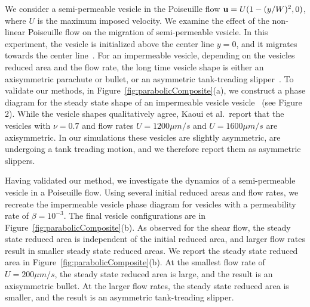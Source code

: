 \documentclass[9pt,twocolumn,twoside,lineno]{pnas-new}
\begin{document}
We consider a semi-permeable vesicle in the Poiseuille flow $\mathbf{u} =
U(1-(y/W)^2,0)$, where $U$ is the maximum imposed velocity. We examine
the effect of the non-linear Poiseuille flow on the migration of
semi-permeable vesicle. In this experiment, the vesicle is initialized
above the center line $y=0$, and it migrates towards the center
line~\cite{dan-vla-mis2009}. For an impermeable vesicle, depending on
the vesicles reduced area and the flow rate, the long time vesicle shape
is either an axisymmetric parachute or bullet, or an asymmetric
tank-treading slipper~\cite{kao-bir-mis2009}. To validate our methods,
in Figure~\ref{fig:parabolicComposite}(a), we construct a phase diagram
for the steady state shape of an impermeable vesicle
vesicle~\cite{kao-bir-mis2009} (see Figure 2). While the vesicle shapes
qualitatively agree, Kaoui et al.~report that the vesicles with
$\nu=0.7$ and flow rates $U = 1200 \mu m/s$ and $U = 1600 \mu m/s$ are
axisymmetric. In our simulations these vesicles are slightly asymmetric,
are undergoing a tank treading motion, and we therefore report them as
asymmetric slippers.

Having validated our method, we investigate the dynamics of a
semi-permeable vesicle in a Poiseuille flow. Using several initial
reduced areas and flow rates, we recreate the impermeable vesicle phase
diagram for vesicles with a permeability rate of $\beta = 10^{-3}$. The
final vesicle configurations are in
Figure~\ref{fig:parabolicComposite}(b). As observed for the shear flow,
the steady state reduced area is independent of the initial reduced
area, and larger flow rates result in smaller steady state reduced
areas. We report the steady state reduced area in
Figure~\ref{fig:parabolicComposite}(b). At the smallest flow rate of $U
= 200 \mu m/s$, the steady state reduced area is large, and the result
is an axisymmetric bullet. At the larger flow rates, the steady state
reduced area is smaller, and the result is an asymmetric tank-treading
slipper.


\end{document}
